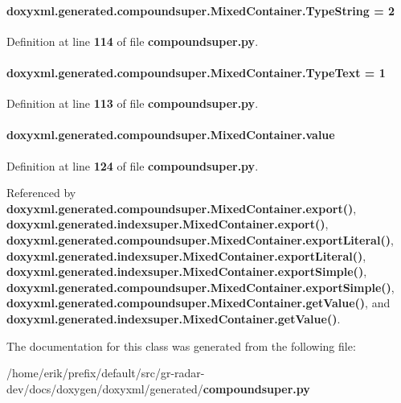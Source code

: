 \paragraph[{Type\+String}]{ doxyxml.\+generated.\+compoundsuper.\+Mixed\+Container.\+Type\+String = 2\hspace{0.3cm}{\ttfamily [static]}}\label{classdoxyxml_1_1generated_1_1compoundsuper_1_1MixedContainer_ab5d9836720c4a372dd40f3f3fb3d2aae}


Definition at line {\bf 114} of file {\bf compoundsuper.\+py}.

\paragraph[{Type\+Text}]{ doxyxml.\+generated.\+compoundsuper.\+Mixed\+Container.\+Type\+Text = 1\hspace{0.3cm}{\ttfamily [static]}}\label{classdoxyxml_1_1generated_1_1compoundsuper_1_1MixedContainer_ab620b8e6023430802a104bf1be483f67}


Definition at line {\bf 113} of file {\bf compoundsuper.\+py}.

\paragraph[{value}]{\setlength{\rightskip}{0pt plus 5cm}doxyxml.\+generated.\+compoundsuper.\+Mixed\+Container.\+value}\label{classdoxyxml_1_1generated_1_1compoundsuper_1_1MixedContainer_a12c2abc2232546d9f2fed2f9a8930243}


Definition at line {\bf 124} of file {\bf compoundsuper.\+py}.



Referenced by {\bf doxyxml.\+generated.\+compoundsuper.\+Mixed\+Container.\+export()}, {\bf doxyxml.\+generated.\+indexsuper.\+Mixed\+Container.\+export()}, {\bf doxyxml.\+generated.\+compoundsuper.\+Mixed\+Container.\+export\+Literal()}, {\bf doxyxml.\+generated.\+indexsuper.\+Mixed\+Container.\+export\+Literal()}, {\bf doxyxml.\+generated.\+indexsuper.\+Mixed\+Container.\+export\+Simple()}, {\bf doxyxml.\+generated.\+compoundsuper.\+Mixed\+Container.\+export\+Simple()}, {\bf doxyxml.\+generated.\+compoundsuper.\+Mixed\+Container.\+get\+Value()}, and {\bf doxyxml.\+generated.\+indexsuper.\+Mixed\+Container.\+get\+Value()}.



The documentation for this class was generated from the following file\+:\begin{DoxyCompactItemize}
\item 
/home/erik/prefix/default/src/gr-\/radar-\/dev/docs/doxygen/doxyxml/generated/{\bf compoundsuper.\+py}\end{DoxyCompactItemize}
